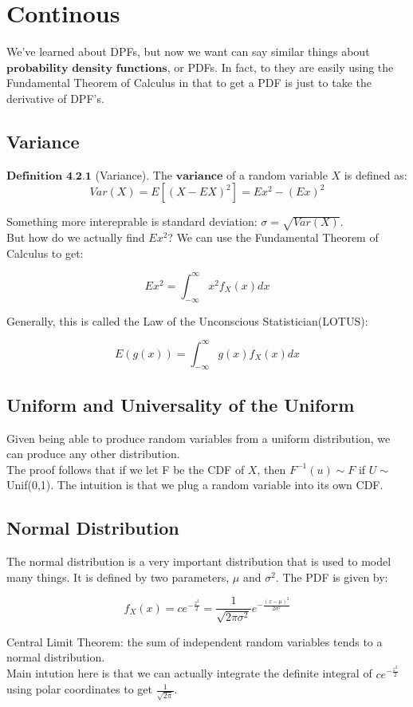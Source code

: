\documentclass{article}
\begin{document}
    \section{Continous}

    We've learned about DPFs, but now we want can say similar things about $\textbf{probability density functions}$, or PDFs. In fact, to they are easily using the Fundamental Theorem of Calculus in that to get a PDF is just to take the derivative of DPF's.\\

    \subsection*{Variance}

    $\textbf{Definition 4.2.1}$ (Variance). The $\textbf{variance}$ of a random variable $X$ is defined as:
    $$Var(X) = E[(X-EX)^2] = Ex^2 - (Ex)^2$$

    Something more intereprable is standard deviation: $\sigma = \sqrt{Var(X)}$.\\

    But how do we actually find $Ex^2$? We can use the Fundamental Theorem of Calculus to get:

    $$Ex^2 = \int_{-\infty}^{\infty} x^2f_X(x)dx$$

    Generally, this is called the Law of the Unconscious Statistician(LOTUS):

    $$E(g(x)) = \int_{-\infty}^{\infty} g(x)f_X(x)dx$$

    \subsection*{Uniform and Universality of the Uniform}

    Given being able to produce random variables from a uniform distribution, we can produce any other distribution.\\

    The proof follows that if we let F be the CDF of $X$, then $F^{-1}(u) \sim F$ if $U\sim $ Unif(0,1). The intuition is that we plug a random variable into its own CDF.\\

    \subsection*{Normal Distribution}

    The normal distribution is a very important distribution that is used to model many things. It is defined by two parameters, $\mu$ and $\sigma^2$. The PDF is given by:

    $$f_X(x) = ce^{-\frac{z^2}{2}} = \frac{1}{\sqrt{2\pi\sigma^2}}e^{-\frac{(x-\mu)^2}{2\sigma^2}}$$

    
    Central Limit Theorem: the sum of independent random variables tends to a normal distribution.\\

    Main intution here is that we can actually integrate the definite integral of $ce^{-\frac{z^2}{2}}$ using polar coordinates to get $\frac{1}{\sqrt{2\pi}}$.\\ 
\end{document}
